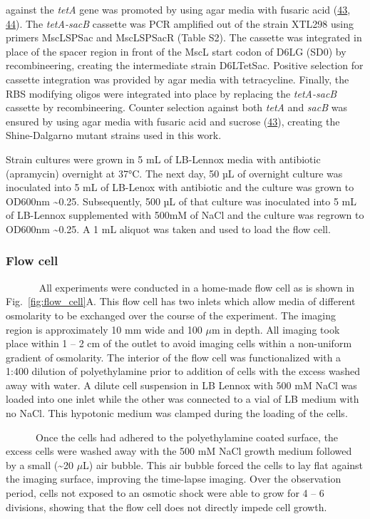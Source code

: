 against
the
\emph{tetA}
gene
was
promoted
by
using
agar
media
with
fusaric
acid
(\protect\hyperlink{ref-li2013}{43},
\protect\hyperlink{ref-bochner1980}{44}).
The
\emph{tetA-sacB}
cassette
was
PCR
amplified
out of
the
strain
XTL298
using
primers
MscLSPSac
and
MscLSPSacR
(Table
S2).
The
cassette
was
integrated
in
place
of the
spacer
region
in
front
of the
MscL
start
codon
of
D6LG
(SD0)
by
recombineering,
creating
the
intermediate
strain
D6LTetSac.
Positive
selection
for
cassette
integration
was
provided
by
agar
media
with
tetracycline.
Finally,
the
RBS
modifying
oligos
were
integrated
into
place
by
replacing
the
\emph{tetA-sacB}
cassette
by
recombineering.
Counter
selection
against
both
\emph{tetA}
and
\emph{sacB}
was
ensured
by
using
agar
media
with
fusaric
acid
and
sucrose
(\protect\hyperlink{ref-li2013}{43}),
creating
the
Shine-Dalgarno
mutant
strains
used
in
this
work.

Strain
cultures
were
grown
in 5
mL of
LB-Lennox
media
with
antibiotic
(apramycin)
overnight
at
37°C.
The
next
day,
50 µL
of
overnight
culture
was
inoculated
into 5
mL of
LB-Lenox
with
antibiotic
and
the
culture
was
grown
to
OD600nm
\textasciitilde{}0.25.
Subsequently,
500 µL
of
that
culture
was
inoculated
into 5
mL of
LB-Lennox
supplemented
with
500mM
of
NaCl
and
the
culture
was
regrown
to
OD600nm
\textasciitilde{}0.25.
A 1 mL
aliquot
was
taken
and
used
to
load
the
flow
cell.

\subsubsection{Flow
cell}\label{flow-cell}

~ ~ ~
~ All
experiments
were
conducted
in a
home-made
flow
cell
as is
shown
in
Fig.~\ref{fig:flow_cell}A.
This
flow
cell
has
two
inlets
which
allow
media
of
different
osmolarity
to be
exchanged
over
the
course
of the
experiment.
The
imaging
region
is
approximately
10 mm
wide
and
100
\(\mu\)m
in
depth.
All
imaging
took
place
within
1 -- 2
cm of
the
outlet
to
avoid
imaging
cells
within
a
non-uniform
gradient
of
osmolarity.
The
interior
of the
flow
cell
was
functionalized
with a
1:400
dilution
of
polyethylamine
prior
to
addition
of
cells
with
the
excess
washed
away
with
water.
A
dilute
cell
suspension
in LB
Lennox
with
500 mM
NaCl
was
loaded
into
one
inlet
while
the
other
was
connected
to a
vial
of LB
medium
with
no
NaCl.
This
hypotonic
medium
was
clamped
during
the
loading
of the
cells.

~ ~ ~
~Once
the
cells
had
adhered
to the
polyethylamine
coated
surface,
the
excess
cells
were
washed
away
with
the
500 mM
NaCl
growth
medium
followed
by a
small
(\textasciitilde{}20
\(\mu\)L)
air
bubble.
This
air
bubble
forced
the
cells
to lay
flat
against
the
imaging
surface,
improving
the
time-lapse
imaging.
Over
the
observation
period,
cells
not
exposed
to an
osmotic
shock
were
able
to
grow
for 4
-- 6
divisions,
showing
that
the
flow
cell
does
not
directly
impede
cell
growth.

